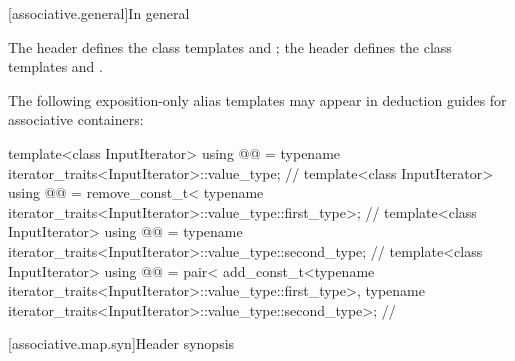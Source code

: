 [associative.general]{In general}

\pnum
The header  defines the class templates  and
; the header  defines the class templates
 and .

\pnum
The following exposition-only alias templates may appear in deduction guides for associative containers:
\begin{codeblock}
template<class InputIterator>
  using @@ =
    typename iterator_traits<InputIterator>::value_type;                // \expos
template<class InputIterator>
  using @@ = remove_const_t<
    typename iterator_traits<InputIterator>::value_type::first_type>;   // \expos
template<class InputIterator>
  using @@ =
    typename iterator_traits<InputIterator>::value_type::second_type;   // \expos
template<class InputIterator>
  using @@ = pair<
    add_const_t<typename iterator_traits<InputIterator>::value_type::first_type>,
    typename iterator_traits<InputIterator>::value_type::second_type>;  // \expos
\end{codeblock}

[associative.map.syn]{Header  synopsis}

